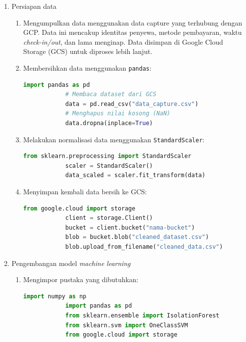     \begin{enumerate}
      \item {Persiapan data}
      \begin{enumerate}
        \item Mengumpulkan data menggunakan {data capture} yang terhubung dengan GCP. Data ini mencakup identitas penyewa, metode pembayaran, waktu {\it check-in/out}, dan lama menginap. Data disimpan di Google Cloud Storage (GCS) untuk diproses lebih lanjut.
        \item Membersihkan data menggunakan \texttt{pandas}:
        \begin{lstlisting}[language=Python]
            import pandas as pd
            # Membaca dataset dari GCS
            data = pd.read_csv("data_capture.csv")
            # Menghapus nilai kosong (NaN)
            data.dropna(inplace=True)
        \end{lstlisting}
        
        \item Melakukan normalisasi data menggunakan \texttt{StandardScaler}:
        \begin{lstlisting}[language=Python]
            from sklearn.preprocessing import StandardScaler
            scaler = StandardScaler()
            data_scaled = scaler.fit_transform(data)
        \end{lstlisting}
        
        \item Menyimpan kembali data bersih ke GCS:
        \begin{lstlisting}[language=Python]
            from google.cloud import storage
            client = storage.Client()
            bucket = client.bucket("nama-bucket")
            blob = bucket.blob("cleaned_dataset.csv")
            blob.upload_from_filename("cleaned_data.csv")
        \end{lstlisting}
      \end{enumerate}
    
      \item {Pengembangan model {\it machine learning}}
      \begin{enumerate}
        \item Mengimpor pustaka yang dibutuhkan:
        \begin{lstlisting}[language=Python]
            import numpy as np
            import pandas as pd
            from sklearn.ensemble import IsolationForest
            from sklearn.svm import OneClassSVM
            from google.cloud import storage
        \end{lstlisting}
        

\end{enumerate}
\end{enumerate}
